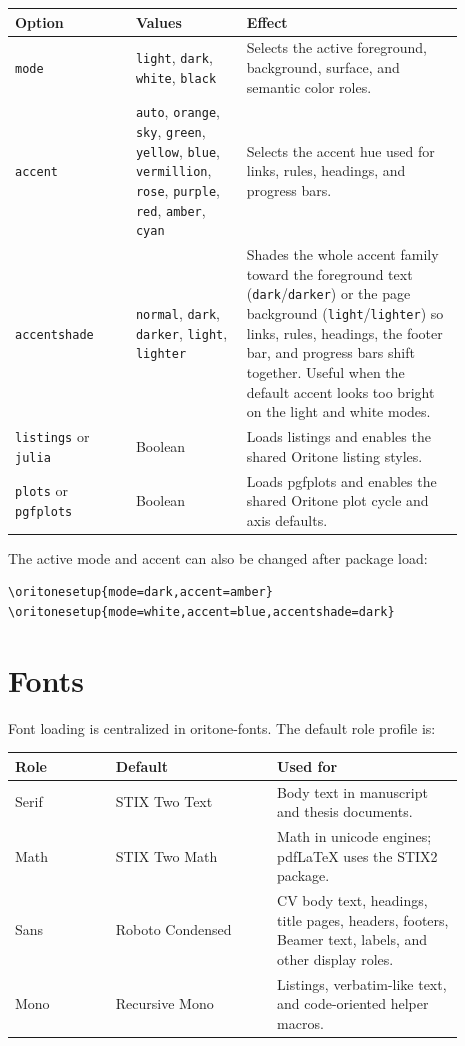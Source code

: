 \documentclass[white,11pt,oneside]{oritone-manuscript}
\newcommand{\pkg}[1]{\textsf{#1}}
\newcommand{\opt}[1]{\texttt{#1}}
\begin{document}
\begin{center}
\small
\renewcommand{\arraystretch}{1.15}
\begin{tabular}{p{0.24\linewidth}p{0.22\linewidth}p{0.43\linewidth}}
\hline
Option & Values & Effect \\
\hline
\opt{mode} & \opt{light}, \opt{dark}, \opt{white}, \opt{black} &
Selects the active foreground, background, surface, and semantic color roles. \\
\opt{accent} &
\opt{auto}, \opt{orange}, \opt{sky}, \opt{green}, \opt{yellow}, \opt{blue},
\opt{vermillion}, \opt{rose}, \opt{purple}, \opt{red}, \opt{amber},
\opt{cyan} &
Selects the accent hue used for links, rules, headings, and progress bars. \\
\opt{accentshade} &
\opt{normal}, \opt{dark}, \opt{darker}, \opt{light}, \opt{lighter} &
Shades the whole accent family toward the foreground text (\opt{dark}/\opt{darker})
or the page background (\opt{light}/\opt{lighter}) so links, rules, headings, the
footer bar, and progress bars shift together. Useful when the default accent
looks too bright on the light and white modes. \\
\opt{listings} or \opt{julia} & Boolean &
Loads \pkg{listings} and enables the shared Oritone listing styles. \\
\opt{plots} or \opt{pgfplots} & Boolean &
Loads \pkg{pgfplots} and enables the shared Oritone plot cycle and axis
defaults. \\
\hline
\end{tabular}
\end{center}

The active mode and accent can also be changed after package load:

\begin{lstlisting}[language={[LaTeX]TeX}]
\oritonesetup{mode=dark,accent=amber}
\oritonesetup{mode=white,accent=blue,accentshade=dark}
\end{lstlisting}

\section{Fonts}
\label{sec:fonts}

Font loading is centralized in \pkg{oritone-fonts}. The default role profile is:

\begin{center}
\small
\renewcommand{\arraystretch}{1.15}
\begin{tabular}{p{0.2\linewidth}p{0.32\linewidth}p{0.37\linewidth}}
\hline
Role & Default & Used for \\
\hline
Serif & STIX Two Text & Body text in manuscript and thesis documents. \\
Math & STIX Two Math & Math in unicode engines; pdfLaTeX uses the STIX2
package. \\
Sans & Roboto Condensed & CV body text, headings, title pages, headers, footers,
Beamer text, labels, and other display roles. \\
Mono & Recursive Mono & Listings, verbatim-like text, and code-oriented helper
macros. \\
\hline
\end{tabular}
\end{center}
\end{document}
